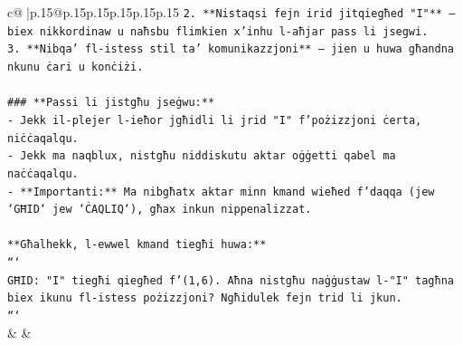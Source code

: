 \documentclass{article}
\begin{document}
{\begin{supertabular}{c@{$\;$}|p{.15\linewidth}@{}p{.15\linewidth}p{.15\linewidth}p{.15\linewidth}p{.15\linewidth}p{.15\linewidth}}
{{{\texttt{2. **Nistaqsi fejn irid jitqiegħed "I"** – biex nikkordinaw u naħsbu flimkien x'inhu l{-}aħjar pass li jsegwi.} \\
\texttt{3. **Nibqa' fl{-}istess stil ta' komunikazzjoni** – jien u huwa għandna nkunu ċari u konċiżi.} \\
\\ 
\texttt{\#\#\# **Passi li jistgħu jseġwu:**} \\
\texttt{{-} Jekk il{-}plejer l{-}ieħor jgħidli li jrid "I" f'pożizzjoni ċerta, niċċaqalqu.} \\
\texttt{{-} Jekk ma naqblux, nistgħu niddiskutu aktar oġġetti qabel ma naċċaqalqu.} \\
\texttt{{-} **Importanti:** Ma nibgħatx aktar minn kmand wieħed f'daqqa (jew `GĦID` jew `ĊAQLIQ`), għax inkun nippenalizzat.} \\
\\ 
\texttt{**Għalhekk, l{-}ewwel kmand tiegħi huwa:**} \\
\texttt{```} \\
\texttt{GĦID: "I" tiegħi qiegħed f'(1,6). Aħna nistgħu naġġustaw l{-}"I" tagħna biex ikunu fl{-}istess pożizzjoni? Ngħidulek fejn trid li jkun.} \\
\texttt{```} \\
            }
        }
    }
    & & \\ \\


\end{supertabular}}
\end{document}

